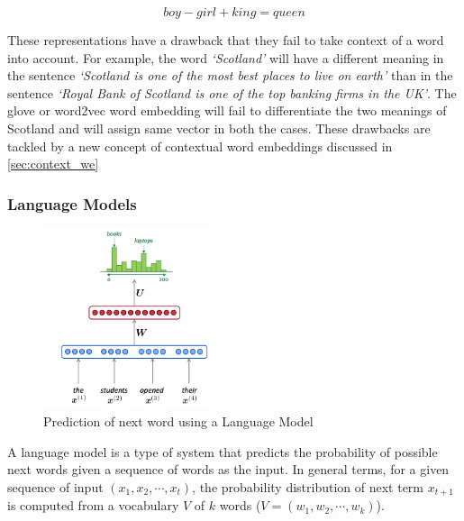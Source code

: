 \begin{equation}\label{eq:we1}
    boy - girl + king = queen
\end{equation}


These representations have a drawback that they fail to take context of a word into account. For example, the word \textit{`Scotland'} will have a different meaning in the sentence \textit{`Scotland is one of the most best places to live on earth'} than in the sentence \textit{`Royal Bank of Scotland is one of the top banking firms in the UK'}. The glove or word2vec word embedding will fail to differentiate the two meanings of Scotland and will assign same vector in both the cases. These drawbacks are tackled by a new concept of contextual word embeddings discussed in \cref{sec:context_we}

\subsubsection{Language Models}\label{sec:lm}

\begin{figure}
    \centering
    \includegraphics[width=0.45\textwidth]{images/lang_model.png}
    \caption{Prediction of next word using a Language Model}
    \label{fig:lang_model}
\end{figure}

A language model is a type of system that predicts the probability of possible next words given a sequence of words as the input. In general terms, for a given sequence of input $(x_{1}, x_{2}, \cdots, x_{t})$, the probability distribution of next term $x_{t+1}$ is computed from a vocabulary $V$ of $k$ words ($V = (w_{1}, w_{2}, \cdots, w_{k})$). 

